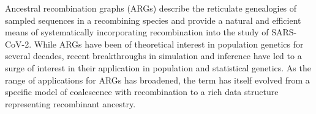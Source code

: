 \documentclass[12pt]{article}
\begin{document}

Ancestral recombination graphs (ARGs) describe the reticulate
genealogies of sampled sequences in a recombining species\cite{Wong2024}
and provide a natural and efficient means of
systematically incorporating recombination
into the study of SARS-CoV-2.
While ARGs have been of theoretical interest in population genetics
for several decades\cite{Hudson1983,Griffiths1997ancestral},
recent breakthroughs in
simulation
and inference
\cite{Rasmussen2014,Kelleher2016,Kelleher2018efficient,Kelleher2019,Speidel2019}
have led to a surge
of interest in their application in population and statistical
genetics\cite{Brandt2024,Lewanski2024,Nielsen2025}.
As the range of applications for ARGs has broadened, the term has itself evolved from a specific model of coalescence with
recombination \cite{Hudson1983,Griffiths1997ancestral} to a
rich data structure representing recombinant
ancestry\cite{Minichiello2006mapping,Wong2024}.
\end{document}
